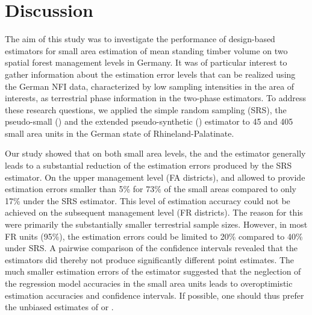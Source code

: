 \section{Discussion} %
\label{sec:Dis}

The aim of this study was to investigate the performance of design-based estimators for small area estimation of mean standing timber volume on two spatial forest management levels in Germany. It was of particular interest to gather information about the estimation error levels that can be realized using the German NFI data, characterized by low sampling intensities in the area of interests, as terrestrial phase information in the two-phase estimators. To address these research questions, we applied the simple random sampling (SRS), the pseudo-small (\psmall{}) and the extended pseudo-synthetic (\extpsynth{}) estimator to 45 and 405 small area units in the German state of Rhineland-Palatinate.\par

Our study showed that on both small area levels, the \psmall{} and the \extpsynth{} estimator generally leads to a substantial reduction of the estimation errors produced by the SRS estimator. On the upper management level (FA districts), \psmall{} and \extpsynth{} allowed to provide estimation errors smaller than 5\% for 73\% of the small areas compared to only 17\% under the SRS estimator. This level of estimation accuracy could not be achieved on the subsequent management level (FR districts). The reason for this were primarily the substantially smaller terrestrial sample sizes. However, in most FR units (95\%), the estimation errors could be limited to 20\% compared to 40\% under SRS. A pairwise comparison of the confidence intervals revealed that the estimators did thereby not produce significantly different point estimates. The much smaller estimation errors of the \psynth{} estimator suggested that the neglection of the regression model accuracies in the small area units leads to overoptimistic estimation accuracies and confidence intervals. If possible, one should thus prefer the unbiased estimates of \psmall{} or \extpsynth{}.\par

